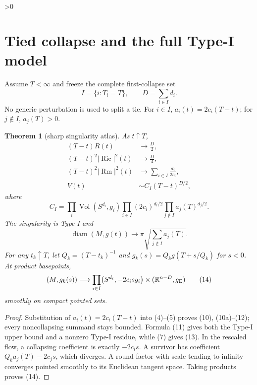 \documentclass[10pt]{article}
\providecommand{\CRevisionRound}{2}
\newtheorem{theorem}{Theorem}
\newcommand{\Ric}{\operatorname{Ric}}
\newcommand{\Rm}{\operatorname{Rm}}
\newcommand{\Vol}{\operatorname{Vol}}
\newcommand{\diam}{\operatorname{diam}}
\newcommand{\R}{\mathbb R}
\begin{document}
\ifnum\CRevisionRound>0
\section{Tied collapse and the full Type-I model}
Assume $T<\infty$ and freeze the complete first-collapse set
\[
 I=\{i:T_i=T\},\qquad D=\sum_{i\in I}d_i.                 \tag{9}
\]
No generic perturbation is used to split a tie.  For $i\in I$,
$a_i(t)=2c_i(T-t)$; for $j\notin I$, $a_j(T)>0$.

\begin{theorem}[sharp singularity atlas]\label{thm:sing}
As $t\uparrow T$,
\begin{align}
 (T-t)R(t)&\longrightarrow \frac D2,                       \tag{10}\\
 (T-t)^2|\Ric|^2(t)&\longrightarrow \frac D4,              \tag{10a}\\
 (T-t)^2|\Rm|^2(t)&\longrightarrow
       \sum_{i\in I}\frac{d_i}{2c_i},                    \tag{11}\\
 V(t)&\sim C_I(T-t)^{D/2},                                 \tag{12}
\end{align}
where
\[
 C_I=\prod_i\Vol(S^{d_i},g_i)
     \prod_{i\in I}(2c_i)^{d_i/2}
     \prod_{j\notin I}a_j(T)^{d_j/2}.
\]
The singularity is Type I and
\begin{equation}
 \diam(M,g(t))\longrightarrow
 \pi\sqrt{\sum_{j\notin I}a_j(T)}.                       \tag{13}
\end{equation}
For any $t_k\uparrow T$, let $Q_k=(T-t_k)^{-1}$ and
$g_k(s)=Q_kg(T+s/Q_k)$ for $s<0$.  At product basepoints,
\begin{equation}
 (M,g_k(s))\longrightarrow
 \prod_{i\in I}\bigl(S^{d_i},-2c_isg_i\bigr)
 \times(\R^{n-D},g_{\rm E})                              \tag{14}
\end{equation}
smoothly on compact pointed sets.
\end{theorem}
\begin{proof}
Substitution of $a_i(t)=2c_i(T-t)$ into (4)--(5) proves
(10), (10a)--(12); every noncollapsing summand stays bounded.  Formula (11) gives
both the Type-I upper bound and a nonzero Type-I residue, while (7) gives
(13).  In the rescaled flow, a collapsing coefficient is exactly
$-2c_is$.  A survivor has coefficient $Q_ka_j(T)-2c_js$, which diverges.
A round factor with scale tending to infinity converges pointed smoothly to
its Euclidean tangent space.  Taking products proves (14).
\end{proof}
\end{document}
